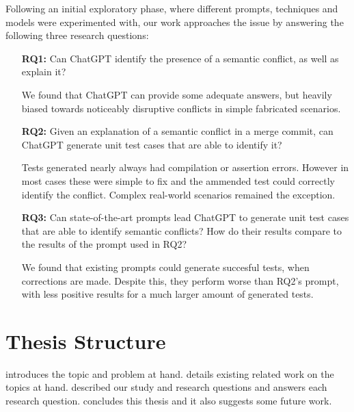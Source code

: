Following an initial exploratory phase, where different prompts, techniques and models were experimented with, our work approaches the issue by answering
the following three research questions:

\begin{itemize}
    \item[\textbf{RQ1:}] Can ChatGPT identify the presence of a semantic conflict, as well as explain it?
    
    We found that ChatGPT can provide some adequate answers, but heavily biased towards noticeably disruptive conflicts
    in simple fabricated scenarios. \\
  
    \item[\textbf{RQ2:}] Given an explanation of a semantic conflict in a merge
    commit, can ChatGPT generate unit test cases that are able to identify it?
    
    Tests generated nearly always had compilation or assertion errors. However in most
    cases these were simple to fix and the ammended test could correctly identify the conflict.
    Complex real-world scenarios remained the exception.\\
  
    \item[\textbf{RQ3:}] Can state-of-the-art prompts lead ChatGPT to generate
    unit test cases that are able to identify semantic conflicts?  How do their
    results compare to the results of the prompt used in RQ2?
    
    We found that existing prompts could generate succesful tests, when corrections are made. Despite this,
    they perform worse than RQ2's prompt, with less positive results for a much larger amount of generated tests.\\
  \end{itemize}

\section{Thesis Structure} \label{sec:struct}


 introduces the topic and problem at hand.
 details existing related work on the topics at hand.
 described our study and research questions and  answers each research question.
 concludes this thesis and it also suggests some future work.
